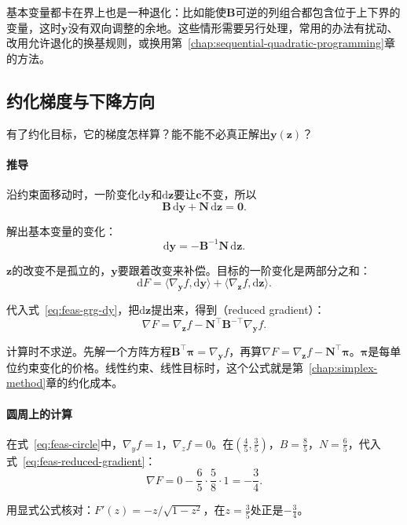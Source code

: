 基本变量都卡在界上也是一种退化：比如能使$\bm{B}$可逆的列组合都包含位于上下界的变量，这时$\bm{y}$没有双向调整的余地。这些情形需要另行处理，常用的办法有扰动、改用允许退化的换基规则，或换用第~\ref{chap:sequential-quadratic-programming}章的方法。

\subsection{约化梯度与下降方向}
\label{sec:feas-grg-gradient}

有了约化目标，它的梯度怎样算？能不能不必真正解出$\bm{y}(\bm{z})$？

\paragraph{推导}
沿约束面移动时，一阶变化$\mathrm{d}\bm{y}$和$\mathrm{d}\bm{z}$要让$\bm{c}$不变，所以
\[
 \bm{B}\,\mathrm{d}\bm{y}+\bm{N}\,\mathrm{d}\bm{z}=\bm{0}.
\]

解出基本变量的变化：
\begin{equation}
 \mathrm{d}\bm{y}=-\bm{B}^{-1}\bm{N}\,\mathrm{d}\bm{z}.
 \label{eq:feas-grg-dy}
\end{equation}

$\bm{z}$的改变不是孤立的，$\bm{y}$要跟着改变来补偿。目标的一阶变化是两部分之和：
\[
 \mathrm{d}F=\langle\nabla_{\bm{y}}f,\mathrm{d}\bm{y}\rangle+\langle\nabla_{\bm{z}}f,\mathrm{d}\bm{z}\rangle.
\]

代入式~\eqref{eq:feas-grg-dy}，把$\mathrm{d}\bm{z}$提出来，得到（reduced gradient）：
\begin{equation}
 \nabla F=\nabla_{\bm{z}}f-\bm{N}^\top\bm{B}^{-\top}\nabla_{\bm{y}}f.
 \label{eq:feas-reduced-gradient}
\end{equation}

计算时不求逆。先解一个方阵方程$\bm{B}^\top\bm{\pi}=\nabla_{\bm{y}}f$，再算$\nabla F=\nabla_{\bm{z}}f-\bm{N}^\top\bm{\pi}$。$\bm{\pi}$是每单位约束变化的价格。线性约束、线性目标时，这个公式就是第~\ref{chap:simplex-method}章的约化成本。

\paragraph{圆周上的计算}
在式~\eqref{eq:feas-circle}中，$\nabla_yf=1$，$\nabla_zf=0$。在$(\tfrac45,\tfrac35)$，$B=\tfrac85$，$N=\tfrac65$，代入式~\eqref{eq:feas-reduced-gradient}：
\[
 \nabla F=0-\frac65\cdot\frac58\cdot1=-\frac34.
\]

用显式公式核对：$F'(z)=-z/\sqrt{1-z^2}$，在$z=\tfrac35$处正是$-\tfrac34$。

